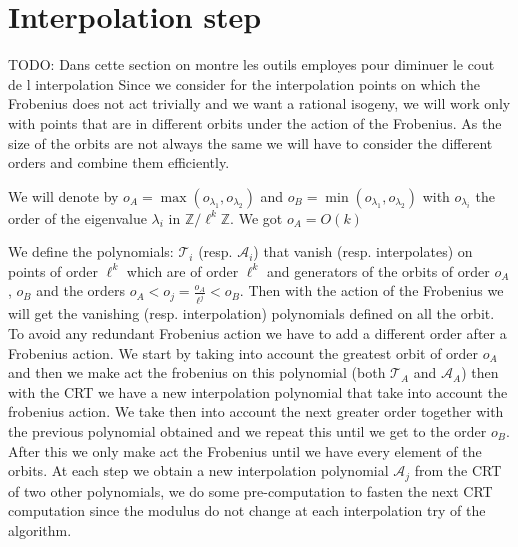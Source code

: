 \documentclass{lms}
\newcommand{\todo}[1]{{\color{red}TODO: #1}}
\begin{document}

\section{Interpolation step}
\label{sec:interpolation}
\todo{Dans cette section on montre les outils employes pour diminuer le cout de l interpolation}
Since we consider for the interpolation points on which the Frobenius does not act trivially and we want a rational isogeny, we will work only with points that are in different orbits under the action of the Frobenius. As the size of the orbits are not always the same we will have to consider the different orders and combine them efficiently.

\begin{defi}
We will denote by $o_A=\max(o_{\lambda_1},o_{\lambda_2})$ and $o_B=\min(o_{\lambda_1},o_{\lambda_2})$ with $o_{\lambda_i}$ the order of the eigenvalue $\lambda_i$ in $\mathbb{Z}/\ell^k\mathbb{Z}$. We got $o_A=O(k)$
\end{defi}

We define the polynomials: $\mathcal{T}_i$ (resp. $\mathcal{A}_i$) that vanish (resp. interpolates) on points of order $\ell^k$ which are of order $\ell^k$ and generators of the orbits of order $o_A$, $o_B$ and the orders $o_A < o_j=\frac{o_A}{\ell^j} < o_B$. Then with the action of the Frobenius we will get the vanishing (resp. interpolation) polynomials defined on all the orbit. To avoid any redundant Frobenius action we have to add a different order after a Frobenius action. %
\newline
We start by taking into account the greatest orbit of order $o_A$ and then we make act the frobenius on this polynomial (both $\mathcal{T}_A$ and $\mathcal{A}_A$) then with the CRT we have a new interpolation polynomial that take into account the frobenius action. We take then into account the next greater order together with the previous polynomial obtained and we repeat this until we get to the order $o_B$. After this we only make act the Frobenius until we have every element of the orbits.
\newline
At each step we obtain a new interpolation polynomial $\mathcal{A}_j$ from the CRT of two other polynomials, we do some pre-computation to fasten the next CRT computation since the modulus do not change at each interpolation try of the algorithm.
\end{document}
